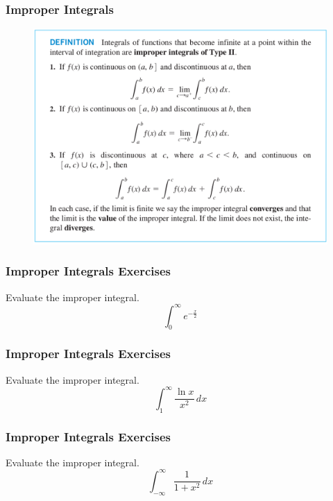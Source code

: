 \documentclass[xcolor=dvipsnames]{beamer}
\begin{document}
\begin{frame}
  \frametitle{Improper Integrals}
  \begin{figure}[h]
    \includegraphics[scale=0.28]{./diagrams/improper4.png}
  \end{figure}
\end{frame}

\begin{frame}
  \frametitle{Improper Integrals Exercises}
{\ubung} Evaluate the improper integral.
  \begin{equation}
    \label{eq:cheifiwo}
    \int_{0}^{\infty}e^{-\frac{x}{2}}
  \end{equation}
\end{frame}

\begin{frame}
  \frametitle{Improper Integrals Exercises}
{\ubung} Evaluate the improper integral.
  \begin{equation}
    \label{eq:eiquiena}
    \int_{1}^{\infty}\frac{\ln{}x}{x^{2}}\,dx
  \end{equation}
\end{frame}

\begin{frame}
  \frametitle{Improper Integrals Exercises}
{\ubung} Evaluate the improper integral.
  \begin{equation}
    \label{eq:yielohwi}
    \int_{-\infty}^{\infty}\frac{1}{1+x^{2}}\,dx
  \end{equation}
\end{frame}
\end{document}
